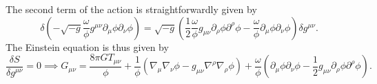 \begin{solution}
    The second term of the action is straightforwardly given by
    \begin{equation}
        \delta\left(-\sqrt{-g}\frac{\omega}{\phi}g^{\mu\nu}\partial_\mu\phi\partial_\nu\phi\right) = \sqrt{-g}\left(\frac{1}{2}\frac{\omega}{\phi}g_{\mu\nu}\partial_\rho\phi\partial^\rho\phi - \frac{\omega}{\phi}\partial_\mu\phi\partial_\nu\phi\right)\delta g^{\mu\nu}.
    \end{equation}
    The Einstein equation is thus given by
    \begin{equation}
        \frac{\delta S}{\delta g^{\mu\nu}} =0 \implies \boxed{G_{\mu\nu} = \frac{8\pi G T_{\mu\nu} }{\phi} + \frac{1}{\phi}(\nabla_\mu\nabla_\nu\phi - g_{\mu\nu}\nabla^\rho\nabla_\rho\phi) + \frac{\omega}{\phi}\left(\partial_\mu\phi\partial_\nu\phi - \frac{1}{2}g_{\mu\nu}\partial_\rho\phi\partial^\rho\phi\right).}
    \end{equation}


\end{solution}
